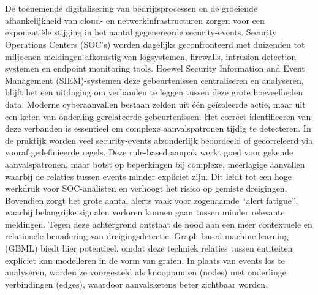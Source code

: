 
\chapter{}%
\label{ch:inleiding}


De toenemende digitalisering van bedrijfsprocessen en de groeiende afhankelijkheid van cloud- en netwerkinfrastructuren zorgen voor een exponentiële stijging in het aantal gegenereerde security-events. Security Operations Centers (SOC’s) worden dagelijks geconfronteerd met duizenden tot miljoenen meldingen afkomstig van logsystemen, firewalls, intrusion detection systemen en endpoint monitoring tools.
\newline
\newline
Hoewel Security Information and Event Management (SIEM)-systemen deze gebeurtenissen centraliseren en analyseren, blijft het een uitdaging om verbanden te leggen tussen deze grote hoeveelheden data. Moderne cyberaanvallen bestaan zelden uit één geïsoleerde actie, maar uit een keten van onderling gerelateerde gebeurtenissen. Het correct identificeren van deze verbanden is essentieel om complexe aanvalspatronen tijdig te detecteren.
\newline
\newline
In de praktijk worden veel security-events afzonderlijk beoordeeld of gecorreleerd via vooraf gedefinieerde regels. Deze rule-based aanpak werkt goed voor gekende aanvalspatronen, maar botst op beperkingen bij complexe, meerlagige aanvallen waarbij de relaties tussen events minder expliciet zijn. Dit leidt tot een hoge werkdruk voor SOC-analisten en verhoogt het risico op gemiste dreigingen. Bovendien zorgt het grote aantal alerts vaak voor zogenaamde “alert fatigue”, waarbij belangrijke signalen verloren kunnen gaan tussen minder relevante meldingen. Tegen deze achtergrond ontstaat de nood aan een meer contextuele en relationele benadering van dreigingsdetectie. Graph-based machine learning (GBML) biedt hier potentieel, omdat deze techniek relaties tussen entiteiten expliciet kan modelleren in de vorm van grafen. In plaats van events los te analyseren, worden ze voorgesteld als knooppunten (nodes) met onderlinge verbindingen (edges), waardoor aanvalsketens beter zichtbaar worden. 


